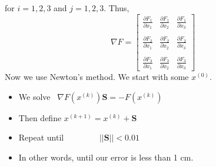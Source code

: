 \documentclass[11pt]{article}
\theoremstyle{definition}
\newcommand{\1}[1]{\mathbf{1} \left \{ #1 \right \}}
\begin{document}
for $i = 1,2,3$ and $j = 1,2,3$.  Thus,
\[\nabla F = \begin{bmatrix}
\frac{\partial F_1}{\partial x_1} & \frac{\partial F_1}{\partial x_2} & \frac{\partial F_1}{\partial x_3} \\ \\
\frac{\partial F_2}{\partial x_1} & \frac{\partial F_2}{\partial x_2} & \frac{\partial F_2}{\partial x_3} \\ \\
\frac{\partial F_3}{\partial x_1} & \frac{\partial F_3}{\partial x_2} & \frac{\partial F_3}{\partial x_3}
\end{bmatrix}\]
Now we use Newton's method.  We start with some $x^{(0)}$.
\begin{itemize}
    \item We solve \ \qquad \(\nabla F(x^{(k)})\textbf{S} = -F(x^{(k)})\)
    \item Then define \qquad \quad  \(x^{(k+1)} = x^{(k)} + \textbf{S}\)
    \item Repeat until \(\qquad \qquad ||\textbf{S}|| < 0.01\)
    \item In other words, until our error is less than 1 cm.
\end{itemize}
\end{document}
